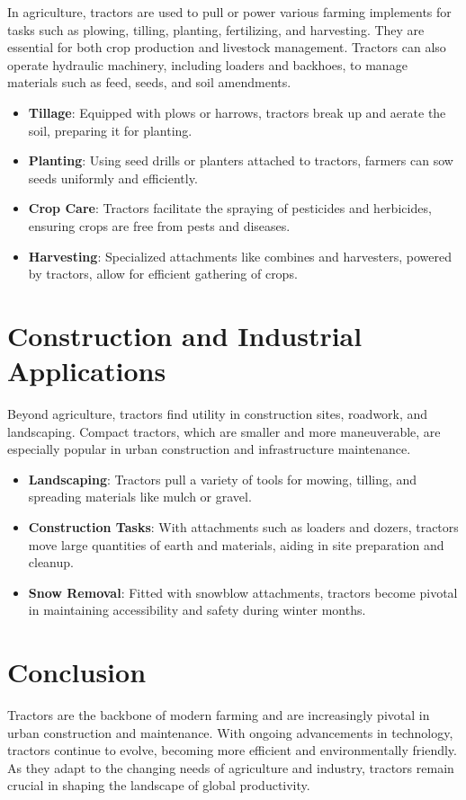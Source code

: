 \documentclass[a4paper,12pt]{article}
\begin{document}
	In agriculture, tractors are used to pull or power various farming implements for tasks such as plowing, tilling, planting, fertilizing, and harvesting. They are essential for both crop production and livestock management. Tractors can also operate hydraulic machinery, including loaders and backhoes, to manage materials such as feed, seeds, and soil amendments.
	
	\begin{itemize}
		\item \textbf{Tillage}: Equipped with plows or harrows, tractors break up and aerate the soil, preparing it for planting.
		\item \textbf{Planting}: Using seed drills or planters attached to tractors, farmers can sow seeds uniformly and efficiently.
		\item \textbf{Crop Care}: Tractors facilitate the spraying of pesticides and herbicides, ensuring crops are free from pests and diseases.
		\item \textbf{Harvesting}: Specialized attachments like combines and harvesters, powered by tractors, allow for efficient gathering of crops.
	\end{itemize}

	\section{Construction and Industrial Applications}
	
	Beyond agriculture, tractors find utility in construction sites, roadwork, and landscaping. Compact tractors, which are smaller and more maneuverable, are especially popular in urban construction and infrastructure maintenance.
	
	\begin{itemize}
		\item \textbf{Landscaping}: Tractors pull a variety of tools for mowing, tilling, and spreading materials like mulch or gravel.
		\item \textbf{Construction Tasks}: With attachments such as loaders and dozers, tractors move large quantities of earth and materials, aiding in site preparation and cleanup.
		\item \textbf{Snow Removal}: Fitted with snowblow attachments, tractors become pivotal in maintaining accessibility and safety during winter months.
	\end{itemize}
	
	\section{Conclusion}
	
	Tractors are the backbone of modern farming and are increasingly pivotal in urban construction and maintenance. With ongoing advancements in technology, tractors continue to evolve, becoming more efficient and environmentally friendly. As they adapt to the changing needs of agriculture and industry, tractors remain crucial in shaping the landscape of global productivity.
	
	
		
\end{document}
